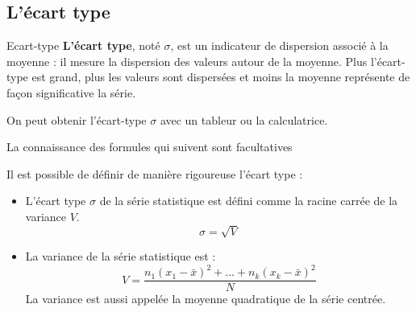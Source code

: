 \documentclass[10pt,a4paper,openany,twoside, eleve]{book}
\begin{document}

\subsection{L'écart type}

\begin{defi}{Ecart-type}{}
\textbf{L'écart type}, noté $\sigma$, est un indicateur de dispersion associé à la moyenne : il mesure la dispersion des valeurs autour de la moyenne. Plus l'écart-type est grand, plus les valeurs sont dispersées et moins la moyenne représente de façon significative la série.

On peut obtenir l'écart-type $\sigma$ avec un tableur ou la calculatrice.
\end{defi}

\begin{rem}{}{}
La connaissance des formules qui suivent sont facultatives

Il est possible de définir de manière rigoureuse l'écart type :
\begin{itemize}
\item[-]L'écart type $\sigma$ de la série statistique est défini comme la racine carrée de la variance $V$.
\[\sigma = \sqrt{V}\]
\item[-]La variance de la série statistique est :
\[V = \frac{n_{1}(x_{1}-\bar x)^{2}+...+n_{k}(x_{k}-\bar x)^{2}}{N}\]
La variance est aussi appelée la moyenne quadratique de la série centrée.
\end{itemize}
\end{rem}




\end{document}
